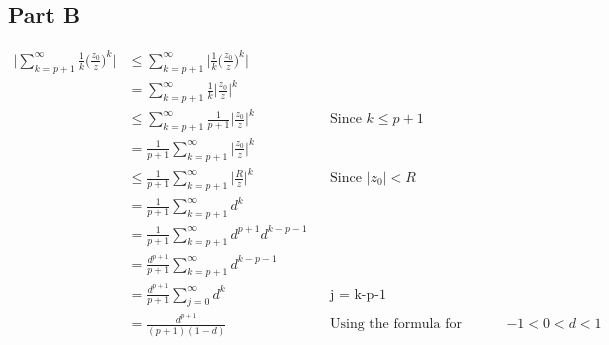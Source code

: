 \documentclass{article}
\begin{document}
\subsection*{Part B}
\begin{align*}
    \Big| \sum_{k=p+1}^{\infty} \frac{1}{k} \big(\frac{z_0}{z} \big)^k \Big|
    & \leq \sum_{k=p+1}^{\infty} \bigg| \frac{1}{k} \big(\frac{z_0}{z} \big)^k \bigg| \\
    &= \sum_{k=p+1}^{\infty} \frac{1}{k} \bigg| \frac{z_0}{z} \bigg|^k \\
    &\leq \sum_{k=p+1}^{\infty} \frac{1}{p+1} \bigg| \frac{z_0}{z} \bigg|^k && \text{Since $k \leq p+1$} \\
    &= \frac{1}{p+1} \sum_{k=p+1}^{\infty} \bigg| \frac{z_0}{z} \bigg|^k \\
    &\leq \frac{1}{p+1} \sum_{k=p+1}^{\infty} \bigg| \frac{R}{z} \bigg|^k && \text{Since $|z_0|<R$} \\
    &= \frac{1}{p+1} \sum_{k=p+1}^{\infty}d^k \\
    &= \frac{1}{p+1} \sum_{k=p+1}^{\infty}d^{p+1} d^{k-p-1} \\
    &= \frac{d^{p+1}}{p+1} \sum_{k=p+1}^{\infty} d^{k-p-1} \\
    &= \frac{d^{p+1}}{p+1} \sum_{j=0}^{\infty} d^k && \text{j = k-p-1}\\
    &= \frac{d^{p+1}}{(p+1)(1-d)} && \text{Using the formula for geometric series, since $-1<0<d<1$}
\end{align*}
\end{document}
